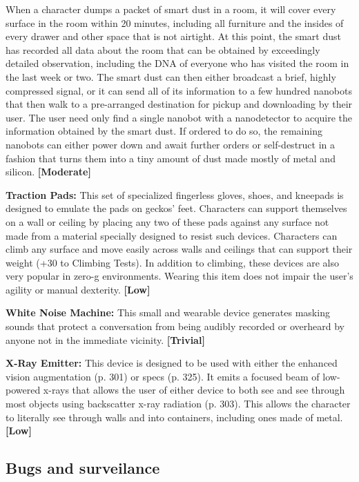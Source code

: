 When a character dumps a packet of smart dust in a room, it will cover every surface in the room within 20 minutes, including all furniture and the insides of every drawer and other space that is not airtight. At this point, the smart dust has recorded all data about the room that can be obtained by exceedingly detailed observation, including the DNA of everyone who has visited the room in the last week or two. The smart dust can then either broadcast a brief, highly compressed signal, or it can send all of its information to a few hundred nanobots that then walk to a pre-arranged destination for pickup and downloading by their user. The user need only find a single nanobot with a nanodetector to acquire the information obtained by the smart dust. If ordered to do so, the remaining nanobots can either power down and await further orders or self-destruct in a fashion that turns them into a tiny amount of dust made mostly of metal and silicon. \textbf{[Moderate]}

\textbf{Traction Pads:} This set of specialized fingerless gloves, shoes, and kneepads is designed to emulate the pads on geckos’ feet. Characters can support themselves on a wall or ceiling by placing any two of these pads against any surface not made from a material specially designed to resist such devices. Characters can climb any surface and move easily across walls and ceilings that can support their weight (+30 to Climbing Tests). In addition to climbing, these devices are also very popular in zero-g environments. Wearing this item does not impair the user’s agility or manual dexterity. \textbf{[Low]}

\textbf{White Noise Machine:} This small and wearable device generates masking sounds that protect a conversation from being audibly recorded or overheard by anyone not in the immediate vicinity. \textbf{[Trivial]}

\textbf{X-Ray Emitter:} This device is designed to be used with either the enhanced vision augmentation (p. 301) or specs (p. 325). It emits a focused beam of low-powered x-rays that allows the user of either device to both see and see through most objects using backscatter x-ray radiation (p. 303). This allows the character to literally see through walls and into containers, including ones made of metal. \textbf{[Low]}

\subsection{Bugs and surveilance}
\label{sec:bugs-surveilance}

